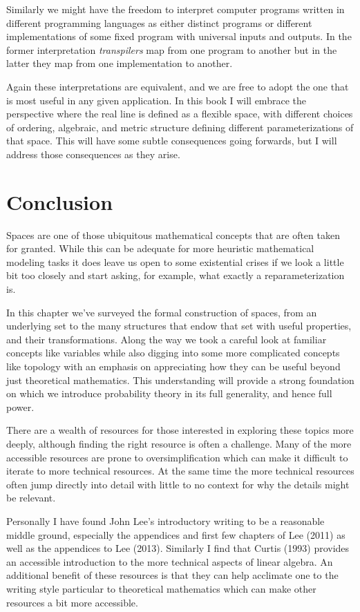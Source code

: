 \documentclass[
  letterpaper,
  DIV=11,
  numbers=noendperiod]{scrartcl}
\begin{document}
Similarly we might have the freedom to interpret computer programs
written in different programming languages as either distinct programs
or different implementations of some fixed program with universal inputs
and outputs. In the former interpretation \emph{transpilers} map from
one program to another but in the latter they map from one
implementation to another.

Again these interpretations are equivalent, and we are free to adopt the
one that is most useful in any given application. In this book I will
embrace the perspective where the real line is defined as a flexible
space, with different choices of ordering, algebraic, and metric
structure defining different parameterizations of that space. This will
have some subtle consequences going forwards, but I will address those
consequences as they arise.

\hypertarget{conclusion}{%
\section{Conclusion}\label{conclusion}}

Spaces are one of those ubiquitous mathematical concepts that are often
taken for granted. While this can be adequate for more heuristic
mathematical modeling tasks it does leave us open to some existential
crises if we look a little bit too closely and start asking, for
example, what exactly a reparameterization is.

In this chapter we've surveyed the formal construction of spaces, from
an underlying set to the many structures that endow that set with useful
properties, and their transformations. Along the way we took a careful
look at familiar concepts like variables while also digging into some
more complicated concepts like topology with an emphasis on appreciating
how they can be useful beyond just theoretical mathematics. This
understanding will provide a strong foundation on which we introduce
probability theory in its full generality, and hence full power.

There are a wealth of resources for those interested in exploring these
topics more deeply, although finding the right resource is often a
challenge. Many of the more accessible resources are prone to
oversimplification which can make it difficult to iterate to more
technical resources. At the same time the more technical resources often
jump directly into detail with little to no context for why the details
might be relevant.

Personally I have found John Lee's introductory writing to be a
reasonable middle ground, especially the appendices and first few
chapters of Lee (2011) as well as the appendices to Lee (2013).
Similarly I find that Curtis (1993) provides an accessible introduction
to the more technical aspects of linear algebra. An additional benefit
of these resources is that they can help acclimate one to the writing
style particular to theoretical mathematics which can make other
resources a bit more accessible.
\end{document}
